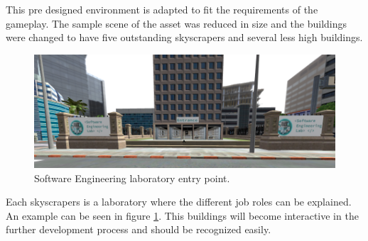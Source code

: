 This pre designed environment is adapted to fit the requirements of the gameplay. The sample scene of the asset was reduced in size and the buildings were changed to have five outstanding skyscrapers and several less high buildings.
\begin{figure}[]
  \includegraphics[width=16cm]{kapitel/software-building.PNG}
  \centering
  \caption{Software Engineering laboratory entry point.}
  \label{fig:game-world-scene}
\end{figure}
Each skyscrapers is a laboratory where the different job roles can be explained. An example can be seen in figure \ref{fig:game-world-scene}. This buildings will become interactive in the further development process and should be recognized easily.
\newpage
